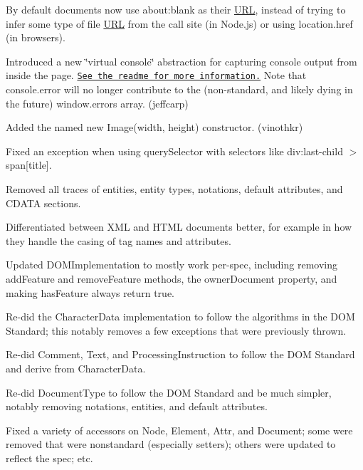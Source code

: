 \begin{DoxyItemize}
\item By default documents now use {\ttfamily about\+:blank} as their \mbox{\hyperlink{namespace_u_r_l}{U\+RL}}, instead of trying to infer some type of file \mbox{\hyperlink{namespace_u_r_l}{U\+RL}} from the call site (in Node.\+js) or using {\ttfamily location.\+href} (in browsers).
\item Introduced a new \char`\"{}virtual console\char`\"{} abstraction for capturing console output from inside the page. \href{https://github.com/tmpvar/jsdom#capturing-console-output}{\tt See the readme for more information.} Note that {\ttfamily console.\+error} will no longer contribute to the (non-\/standard, and likely dying in the future) {\ttfamily window.\+errors} array. (jeffcarp)
\item Added the named {\ttfamily new Image(width, height)} constructor. (vinothkr)
\item Fixed an exception when using {\ttfamily query\+Selector} with selectors like {\ttfamily div\+:last-\/child $>$ span\mbox{[}title\mbox{]}}.
\item Removed all traces of entities, entity types, notations, default attributes, and C\+D\+A\+TA sections.
\item Differentiated between X\+ML and H\+T\+ML documents better, for example in how they handle the casing of tag names and attributes.
\item Updated {\ttfamily D\+O\+M\+Implementation} to mostly work per-\/spec, including removing {\ttfamily add\+Feature} and {\ttfamily remove\+Feature} methods, the {\ttfamily owner\+Document} property, and making {\ttfamily has\+Feature} always return {\ttfamily true}.
\item Re-\/did the {\ttfamily Character\+Data} implementation to follow the algorithms in the D\+OM Standard; this notably removes a few exceptions that were previously thrown.
\item Re-\/did {\ttfamily Comment}, {\ttfamily Text}, and {\ttfamily Processing\+Instruction} to follow the D\+OM Standard and derive from {\ttfamily Character\+Data}.
\item Re-\/did {\ttfamily Document\+Type} to follow the D\+OM Standard and be much simpler, notably removing notations, entities, and default attributes.
\item Fixed a variety of accessors on {\ttfamily Node}, {\ttfamily Element}, {\ttfamily Attr}, and {\ttfamily Document}; some were removed that were nonstandard (especially setters); others were updated to reflect the spec; etc.

\end{DoxyItemize}
